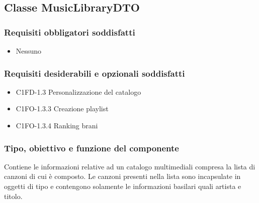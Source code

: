 \subsection{Classe MusicLibraryDTO}
\subsubsection*{Requisiti obbligatori soddisfatti}
\begin{itemize}
	\item Nessuno
\end{itemize}
\subsubsection*{Requisiti desiderabili e opzionali soddisfatti}
\begin{itemize}
    \item C1FD-1.3 Personalizzazione del catalogo
    \item C1FO-1.3.3 Creazione playlist
    \item C1FO-1.3.4 Ranking brani
\end{itemize}
\subsubsection*{Tipo, obiettivo e funzione del componente}
Contiene le informazioni relative ad un catalogo multimediali compresa la lista
di canzoni di cui \`e composto. Le canzoni presenti nella lista sono incapsulate
in oggetti di tipo  e contengono solamente le informazioni
basilari quali artista e titolo.
